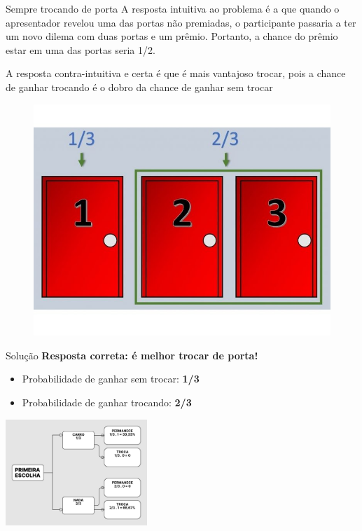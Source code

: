 \begin{frame}[fragile]{Sempre trocando de porta}
A resposta intuitiva ao problema é a que quando o apresentador revelou uma das portas não premiadas, o participante passaria a ter um novo dilema com duas portas e um prêmio. Portanto, a chance do prêmio estar em uma das portas seria 1/2. 
 
A resposta contra-intuitiva e certa é que é mais vantajoso trocar, pois a
chance de ganhar trocando é o dobro da chance de ganhar sem trocar
\begin{figure}
    \centering
    \includegraphics[width=0.45\linewidth]{figures/porc portas.jpg}
    \label{fig:enter-label}
 \end{figure}
\end{frame}

\begin{frame}{Solução}
\textbf{Resposta correta: é melhor trocar de porta!}

\vspace{0.3cm}
\begin{itemize}
  \item Probabilidade de ganhar sem trocar: \textbf{1/3}
  \item Probabilidade de ganhar trocando: \textbf{2/3}
\end{itemize}

\vspace{0.4cm}
\centering
\includegraphics[width=0.4\textwidth]{figures/Grey and White Minimalist Simple Concept Map.jpeg} 
\end{frame}